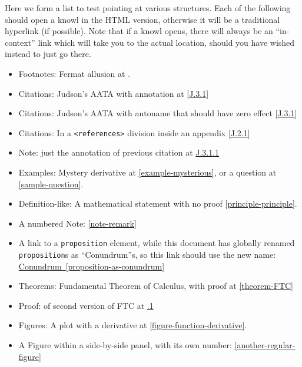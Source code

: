 \documentclass[pdflatex]{sn-jnl}
\theoremstyle{thmstyleone}%
\theoremstyle{thmstyletwo}%
\theoremstyle{thmstylethree}%
\newcommand{\xreffont}{\relax}
\newcommand{\mono}[1]{\texttt{#1}}
\numberwithin{equation}{section}
\begin{document}
Here we form a list to test pointing at various structures.  Each of the following should open a knowl in the HTML version, otherwise it will be a traditional hyperlink (if possible).  Note that if a knowl opens, there will always be an ``in-context'' link which will take you to the actual location, should you have  wished instead to just go there.%
\begin{itemize}[label=\textbullet]
\item{}Footnotes: Fermat allusion at \hyperref[footnote-fermat]{{\xreffont 2.1}}.%
\item{}Citations: Judson's AATA with annotation at \hyperlink{biblio-judson-AATA}{[{\xreffont J.3.1}]}%
\item{}Citations: Judson's AATA with autoname that should have zero effect \hyperlink{biblio-judson-AATA}{[{\xreffont J.3.1}]}%
\item{}Citations: In a \mono{<references>} division inside an appendix \hyperlink{biblio-strang-article-uno}{[{\xreffont J.2.1}]}%
\item{}Note: just the annotation of previous citation at \hyperlink{note-judson-AATA}{{\xreffont J.3.1.1}}%
\item{}Examples: Mystery derivative at \hyperref[example-mysterious]{{\xreffont\ref{example-mysterious}}}, or a question at \hyperref[sample-question]{{\xreffont\ref{sample-question}}}.%
\item{}Definition-like: A mathematical statement with no proof \hyperref[principle-principle]{{\xreffont\ref{principle-principle}}}.%
\item{}A numbered Note: \hyperref[note-remark]{{\xreffont\ref{note-remark}}}%
\item{}A link to a \mono{proposition} element, while this document has globally renamed \mono{proposition}s as ``Conundrum''s, so this link should use the new name: \hyperref[proposition-as-conundrum]{Conundrum~{\xreffont\ref{proposition-as-conundrum}}}%
\item{}Theorems: Fundamental Theorem of Calculus, with proof at \hyperref[theorem-FTC]{{\xreffont\ref{theorem-FTC}}}%
\item{}Proof: of second version of FTC at \hyperlink{proof-FTC-corollary}{{\xreffont 4.1.1}}%
\item{}Figures: A plot with a derivative at \hyperref[figure-function-derivative]{{\xreffont\ref{figure-function-derivative}}}.%
\item{}A Figure within a side-by-side panel, with its own number: \hyperref[another-regular-figure]{{\xreffont\ref{another-regular-figure}}}%

\end{itemize}
\end{document}
